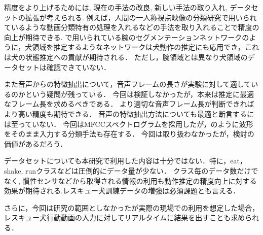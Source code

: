 \documentclass[MIRU,submit]{miru2019j}
\begin{document}
精度をより上げるためには, 現在の手法の改良, 新しい手法の取り入れ, データセットの拡張が考えられる.
例えば，人間の一人称視点映像の分類研究で用いられているような動画分類特有の処理を入れるなどの手法を取り入れることで精度の向上が期待できる.
\cite{minghuang2016fpar}で用いられている腕のセグメンテーションネットワークのように，犬領域を推定するようなネットワークは犬動作の推定にも応用でき，これは犬の状態推定への貢献が期待される．
ただし，腕領域とは異なり犬領域のデータセットは確認できていない．

また音声からの特徴抽出について，音声フレームの長さが実験に対して適しているのかという疑問が残っている．
今回は検証しなかったが，本来は推定に最適なフレーム長を求めるべきである．
より適切な音声フレーム長が判断できればより高い精度も期待できる．
音声の特徴抽出方法についても最適と断言するには至っていない．
今回はMFCCスペクトログラムを採用したが，\cite{aytar2016soundnet}のように波形をそのまま入力する分類手法も存在する．
今回は取り扱わなかったが，検討の価値があるだろう．

データセットについても本研究で利用した内容は十分ではない．特に，eat， shake, runクラスなどは圧倒的にデータ量が少ない．
クラス毎のデータ数だけでなく, 慣性センサなどから取得される情報の利用も動作推定の精度向上に対する効果が期待される.レスキュー犬訓練データの増強は必須課題とも言える．

さらに，今回は研究の範囲としなかったが実際の現場での利用を想定した場合，レスキュー犬行動動画の入力に対してリアルタイムに結果を出すことも求められる．




\end{document}
